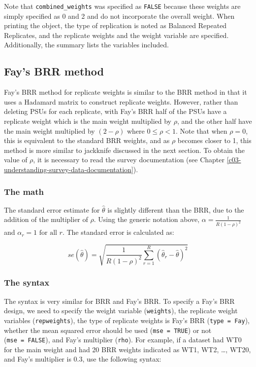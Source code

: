 \documentclass[
]{krantz}
\begin{document}
Note that \texttt{combined\_weights} was specified as \texttt{FALSE} because these weights are simply specified as 0 and 2 and do not incorporate the overall weight. When printing the object, the type of replication is noted as Balanced Repeated Replicates, and the replicate weights and the weight variable are specified. Additionally, the summary lists the variables included.

\hypertarget{fays-brr-method}{%
\subsection{Fay's BRR method}\label{fays-brr-method}}

Fay's BRR method for replicate weights is similar to the BRR method in that it uses a Hadamard matrix to construct replicate weights. However, rather than deleting PSUs for each replicate, with Fay's BRR half of the PSUs have a replicate weight which is the main weight multiplied by \(\rho\), and the other half have the main weight multiplied by \((2-\rho)\) where \(0 \le \rho < 1\). Note that when \(\rho=0\), this is equivalent to the standard BRR weights, and as \(\rho\) becomes closer to 1, this method is more similar to jackknife discussed in the next section. To obtain the value of \(\rho\), it is necessary to read the survey documentation (see Chapter \ref{c03-understanding-survey-data-documentation}).

\hypertarget{the-math-5}{%
\subsubsection*{The math}\label{the-math-5}}


The standard error estimate for \(\hat{\theta}\) is slightly different than the BRR, due to the addition of the multiplier of \(\rho\). Using the generic notation above, \(\alpha=\frac{1}{R \left(1-\rho\right)^2}\) and \(\alpha_r=1 \text{ for all } r\). The standard error is calculated as:

\[se(\hat{\theta})=\sqrt{\frac{1}{R (1-\rho)^2} \sum_{r=1}^R \left( \hat{\theta}_r-\hat{\theta}\right)^2}\]

\hypertarget{the-syntax-5}{%
\subsubsection*{The syntax}\label{the-syntax-5}}


The syntax is very similar for BRR and Fay's BRR. To specify a Fay's BRR design, we need to specify the weight variable (\texttt{weights}), the replicate weight variables (\texttt{repweights}), the type of replicate weights is Fay's BRR (\texttt{type\ =\ Fay}), whether the mean squared error should be used (\texttt{mse\ =\ TRUE}) or not (\texttt{mse\ =\ FALSE}), and Fay's multiplier (\texttt{rho}). For example, if a dataset had WT0 for the main weight and had 20 BRR weights indicated as WT1, WT2, \ldots, WT20, and Fay's multiplier is 0.3, use the following syntax:
\end{document}
